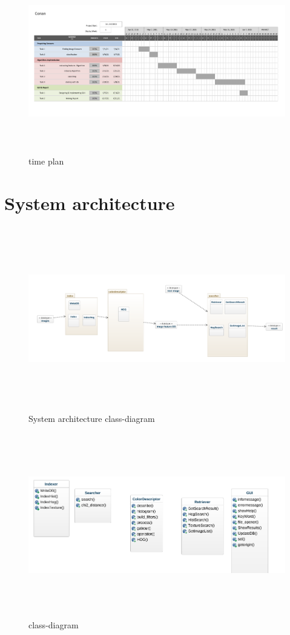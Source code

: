 \documentclass[pdftex,10pt,a4paper,oneside]{article}
\begin{document}
	
	\begin{figure}[H]
		\centering
		\includegraphics[width=140mm,height=80mm]{fig/5.png}
		\caption{time plan }
		\label{time plan}
	\end{figure}
	\pagebreak
	\section{System architecture}
		\begin{figure}[H]
		\centering
		\includegraphics[width=140mm,height=80mm]{fig/22.png}
		\caption{System architecture class-diagram }
		\label{System architecture class-diagram}
	\end{figure}

\begin{figure}[H]
	\centering
	\includegraphics[width=140mm,height=80mm]{fig/23.png}
	\caption{class-diagram }
	\label{class-diagram}
\end{figure}
\end{document}
